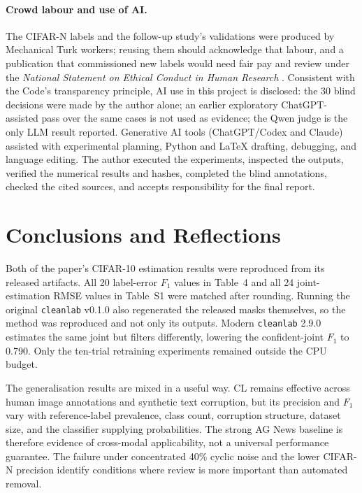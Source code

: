 \documentclass[11pt]{article}
\newcommand{\cleanlab}{\texttt{cleanlab}}
\begin{document}
\paragraph{Crowd labour and use of AI.}
The CIFAR-N labels and the follow-up study's validations were produced by
Mechanical Turk workers; reusing them should acknowledge that labour, and a
publication that commissioned new labels would need fair pay and review under the
\emph{National Statement on Ethical Conduct in Human Research}
\citep{nationalstatement2023}. Consistent with the Code's transparency
principle, AI use in this project is disclosed: the 30 blind decisions were
made by the author alone; an earlier exploratory ChatGPT-assisted pass over
the same cases is not used as evidence; the Qwen judge is the only LLM result
reported. Generative AI tools (ChatGPT/Codex and Claude) assisted with
experimental planning, Python and \LaTeX{} drafting, debugging, and language
editing. The author executed the experiments, inspected the outputs, verified
the numerical results and hashes, completed the blind annotations, checked the
cited sources, and accepts responsibility for the final report.

\section{Conclusions and Reflections}

Both of the paper's CIFAR-10 estimation results were reproduced from its
released artifacts. All 20 label-error $F_1$ values in Table~4 and all 24
joint-estimation RMSE values in Table~S1 were matched after rounding. Running
the original \cleanlab{} v0.1.0 also regenerated the released masks
themselves, so the method was reproduced and not only its outputs. Modern
\cleanlab{} 2.9.0 estimates the same joint but filters differently, lowering
the confident-joint $F_1$ to 0.790. Only the ten-trial retraining experiments
remained outside the CPU budget.

The generalisation results are mixed in a useful way. CL remains effective
across human image annotations and synthetic text corruption, but its precision
and $F_1$ vary with reference-label prevalence, class count, corruption
structure, dataset size, and the classifier supplying probabilities. The
strong AG News baseline is therefore evidence of cross-modal applicability,
not a universal performance guarantee. The failure under concentrated 40\%
cyclic noise and the lower CIFAR-N precision identify conditions where review
is more important than automated removal.
\end{document}
